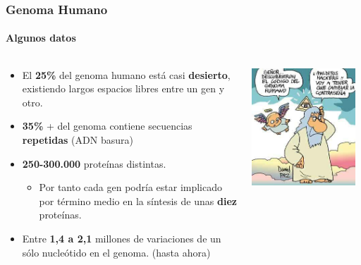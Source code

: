 \begin{frame}
\frametitle{Genoma Humano}
\framesubtitle{Algunos datos}
\begin{columns}
\begin{column}{0.7\textwidth}
	\begin{itemize}
	    \item  El \textbf{25\%} del genoma humano está casi \textbf{desierto}, existiendo largos espacios libres entre un gen y otro.
	    \item \textbf{35\%} + del genoma contiene secuencias \textbf{repetidas} (ADN basura)
	    \item \textbf{250-300.000} proteínas distintas.
	    \begin{itemize}
	        \item Por tanto cada gen podría estar
	        implicado por término medio en la síntesis de unas \textbf{diez} proteínas.
	    \end{itemize}
	    \item Entre \textbf{1,4 a 2,1} millones de variaciones de un sólo
        nucleótido en el genoma. (hasta ahora)
	\end{itemize}
\end{column}
\begin{column}{0.3\textwidth}
	\begin{center}
		\includegraphics[width=0.95\textwidth]{img/genoma-humano.jpg}
	\end{center}
\end{column}
\end{columns}
\end{frame}


